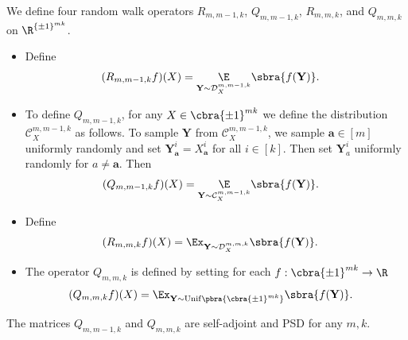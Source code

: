 \begin{definition}
    We define four random walk operators\footnotemark{} $R_{m,m-1,k}$, $Q_{m,m-1,k}$, $R_{m,m,k}$, and $Q_{m,m,k}$ on $\R^{\{\pm1\}^{mk}}$. 
    \begin{itemize}     
        \item Define
        \begin{align*}
            (R_{m,m-1,k}f)(X)&=\underset{\mathbf{Y} \sim\mathcal{D}^{m,m-1,k}_{X}}{\E}\sbra{f(\mathbf{Y})}.
        \end{align*}
           
        \item To define $Q_{m,m-1,k}$, for any $X\in \cbra{\pm1}^{mk}$ we define the distribution $\mathcal{C}^{m,m-1,k}_{X}$ as follows. To sample $\mathbf{Y}$ from $\mathcal{C}^{m,m-1,k}_X$, we sample $\mathbf{a}\in[m]$ uniformly randomly and set $\mathbf{Y}^i_{\mathbf{a}}=X^i_{\mathbf{a}}$ for all $i\in[k]$. Then set $\mathbf{Y}^i_{a}$ uniformly randomly for $a\neq \mathbf{a}$. Then
        \begin{align*}
            (Q_{m,m-1,k}f)(X)&=\underset{\mathbf{Y}\sim\mathcal{C}^{m,m-1,k}_X}{\E}\sbra{f(\mathbf{Y})}.
        \end{align*}
        
        \item Define
        \begin{align*}
            (R_{m,m,k}f)(X)&=\Ex_{\mathbf{Y}\sim\mathcal{D}^{m,m,k}_X}\sbra{f(\mathbf Y)}.
        \end{align*}

        \item The operator $Q_{m,m,k}$ is defined by setting for each $f:\cbra{\pm1}^{mk}\to\R$
        \begin{align*}
            (Q_{m,m,k}f)(X)&=\Ex_{\mathbf{Y}\sim \mathrm{Unif}\pbra{\cbra{\pm1}^{mk}}}\sbra{f(\mathbf{Y})}.
        \end{align*}
    \end{itemize}
\end{definition}
\begin{fact}\label{fact:Q self-adjoint}
    The matrices $Q_{m,m-1,k}$ and $Q_{m,m,k}$ are self-adjoint and PSD for any $m,k$.
\end{fact}

